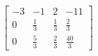 \documentclass[preview]{standalone}
\begin{document}
\begin{align*}
\left[\begin{array}{ccc|c}-3 & -1 & 2 & -11 \\0 & \frac{1}{3} & \frac{1}{3} & \frac{2}{3} \\0 & \frac{5}{3} & \frac{2}{3} & \frac{40}{3}\end{array}\right]
\end{align*}
\end{document}
